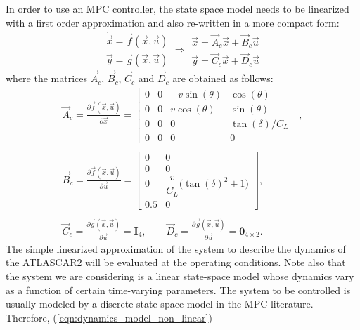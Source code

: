 In order to use an MPC controller, the state space model needs to be linearized with a first order approximation and also re-written in a more compact form:
\begin{equation}
\label{eqn:dynamics_model_non_linear}
\begin{array}{llll}
\dot{\vec{x}} = \vec{f}(\vec{x},\vec{u})\\
\vec{y} = \vec{g}(\vec{x},\vec{u})
\end{array} \Longrightarrow
\begin{array}{ll}
\dot{\vec{x}} =\vec{A}_c \vec{x}+ \vec{B}_c \vec{u}\\
\vec{y} =\vec{C}_c \vec{x} + \vec{D}_c \vec{u}
\end{array}
\end{equation}
where the matrices $\vec{A}_c$, $\vec{B}_c$, $\vec{C}_c$ and $\vec{D}_c$ are obtained as follows:
\begin{equation}
\begin{array}{ccc}
\vec{A}_c=\displaystyle\frac{\partial \vec{f}(\vec{x},\vec{u})}{\partial \vec{x}}=\begin{bmatrix}
0&0&-v\sin(\theta)&\cos(\theta)\\
0&0&v\cos(\theta)&\sin(\theta)\\
0&0&0&\tan(\delta)/C_L\\
0&0&0&0
\end{bmatrix},
\\\\
\vec{B}_c=\displaystyle\frac{\partial \vec{f}(\vec{x},\vec{u})}{\partial \vec{u}}=\begin{bmatrix}
0&0\\
0&0\\
0&\dfrac{v}{C_L}\big(\tan(\delta)^2+1\big)\\
0.5&0
\end{bmatrix},
\\\\
\vec{C}_c=\displaystyle\frac{\partial \vec{g}(\vec{x},\vec{u})}{\partial \vec{u}} = \mathbf{I}_4, 
\qquad
\vec{D}_c=\frac{\partial \vec{g}(\vec{x},\vec{u})}{\partial \vec{u}}=\mathbf{0}_{4\times2}.
\end{array}
\end{equation} 
The simple linearized approximation of the system to describe the dynamics of the ATLASCAR2 will be evaluated at the operating conditions. Note also that the system we are considering is a linear state-space model whose dynamics vary as a function of certain time-varying parameters. The system to be controlled is usually modeled by a discrete state-space model in the MPC literature. Therefore, (\ref{eqn:dynamics_model_non_linear})

